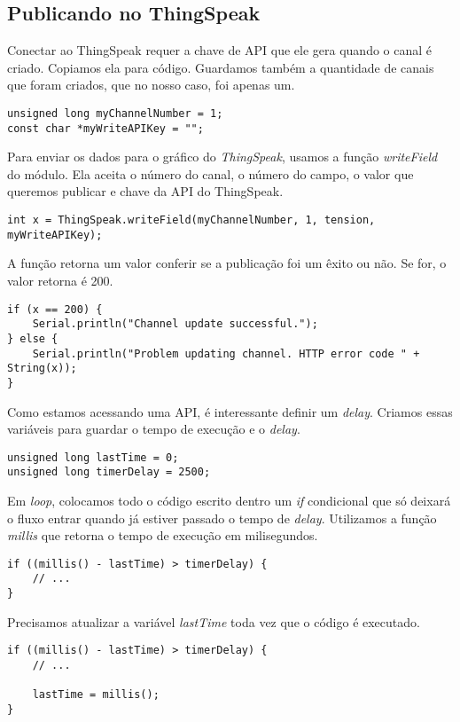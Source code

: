 \subsection{Publicando no ThingSpeak}

Conectar ao ThingSpeak requer a chave de API que ele gera quando o canal é criado. Copiamos ela para código. Guardamos também a quantidade de canais que foram criados, que no nosso caso, foi apenas um.

\begin{lstlisting}
unsigned long myChannelNumber = 1;
const char *myWriteAPIKey = "";
\end{lstlisting}

Para enviar os dados para o gráfico do \textit{ThingSpeak}, usamos a função \textit{writeField} do módulo. Ela aceita o número do canal, o número do campo, o valor que queremos publicar e chave da API do ThingSpeak.

\begin{lstlisting}
int x = ThingSpeak.writeField(myChannelNumber, 1, tension, myWriteAPIKey);
\end{lstlisting}

A função retorna um valor conferir se a publicação foi um êxito ou não. Se for, o valor retorna é 200.

\begin{lstlisting}
if (x == 200) {
    Serial.println("Channel update successful.");
} else {
    Serial.println("Problem updating channel. HTTP error code " + String(x));
}
\end{lstlisting}

Como estamos acessando uma API, é interessante definir um \textit{delay}. Criamos essas variáveis para guardar o tempo de execução e o \textit{delay}.

\begin{lstlisting}
unsigned long lastTime = 0;
unsigned long timerDelay = 2500;
\end{lstlisting}

Em \textit{loop}, colocamos todo o código escrito dentro um \textit{if} condicional que só deixará o fluxo entrar quando já estiver passado o tempo de \textit{delay}. Utilizamos a função \textit{millis} que retorna o tempo de execução em milisegundos.\newpage

\begin{lstlisting}
if ((millis() - lastTime) > timerDelay) {
    // ...
}
\end{lstlisting}

Precisamos atualizar a variável \textit{lastTime} toda vez que o código é executado.

\begin{lstlisting}
if ((millis() - lastTime) > timerDelay) {
    // ...
    
    lastTime = millis();
}
\end{lstlisting}